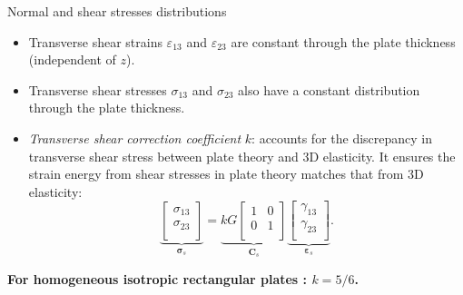 \documentclass[aspectratio=169]{beamer}
\begin{document}
\begin{frame}{Normal and shear stresses distributions}
  \begin{itemize}
    \item  Transverse shear strains $\varepsilon_{13}$ and $\varepsilon_{23}$ are constant through the plate thickness (independent of $z$).
    \item Transverse shear stresses $\sigma_{13}$ and $\sigma_{23}$ also have a constant distribution through the plate thickness.
    \item \emph{Transverse shear correction coefficient} $k$: accounts for the discrepancy in transverse shear stress between plate theory and 3D elasticity. It ensures the strain energy from shear stresses in plate theory matches that from 3D elasticity:
          \[
            \underbrace{\begin{bmatrix}
                \sigma_{13} \\
                \sigma_{23} \\
              \end{bmatrix}}_\text{$\boldsymbol{\sigma}_s$}
            = \underbrace{
              kG
              \begin{bmatrix}
                1 & 0 \\
                0 & 1 \\
              \end{bmatrix}}_\text{$\mathbf{C}_s$}
            \underbrace{\begin{bmatrix}
                \gamma_{13} \\
                \gamma_{23} \\
              \end{bmatrix}}_\text{$\boldsymbol{\varepsilon}_s$}.
          \]
  \end{itemize}
  \begin{block}{}
    \centering \textbf{For homogeneous isotropic rectangular plates : $k=5/6$.}
  \end{block}
\end{frame}
\end{document}
